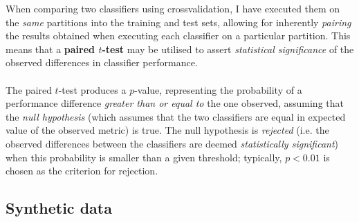 \documentclass[12pt,a4paper,twoside,openright]{report}
\begin{document}
\noindent When comparing two classifiers using crossvalidation, I have executed them on the \emph{same} partitions into the training and test sets, allowing for inherently \emph{pairing} the results obtained when executing each classifier on a particular partition. This means that a \textbf{paired $t$-test} may be utilised to assert \emph{statistical significance} of the observed differences in classifier performance.\\ \\
The paired $t$-test produces a $p$-value, representing the probability of a performance difference \emph{greater than or equal to} the one observed, assuming that the \emph{null hypothesis} (which assumes that the two classifiers are equal in expected value of the observed metric) is true. The null hypothesis is \emph{rejected} (i.e.\!\! the observed differences between the classifiers are deemed \emph{statistically significant}) when this probability is smaller than a given threshold; typically, $p < 0.01$ is chosen as the criterion for rejection.

\subsection{Synthetic data}\label{secsyndata}
\end{document}
